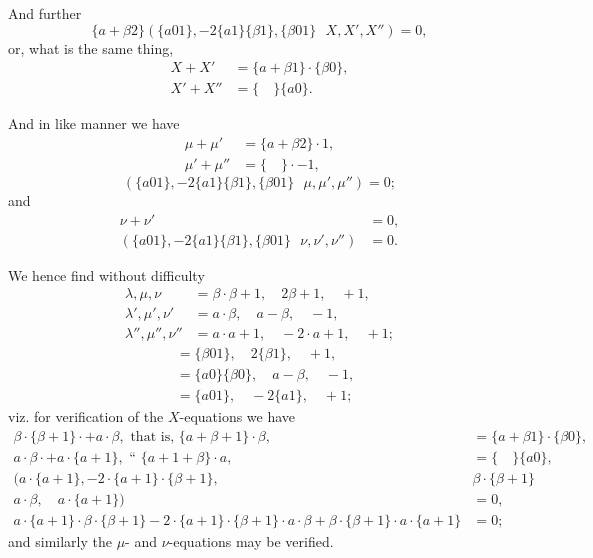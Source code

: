 \documentclass[12pt,a4paper]{article}
\theoremstyle{cayley}
\theoremstyle{definition}
\numberwithin{equation}{section}
\begin{document}
And further
\[
\{a + \beta 2\}(\{a01\}, -2\{a1\}\{\beta1\}, \{\beta01\} \,\,\,\, X, X', X'') = 0,
\]
or, what is the same thing,
\begin{align*}
X + X' &= \{a + \beta 1\} \cdot \{\beta 0\}, \\
X' + X'' &= \{ \quad \} \{a0\}.
\end{align*}

And in like manner we have
\begin{align*}
\mu + \mu' &= \{a + \beta 2\} \cdot 1, \\
\mu' + \mu'' &= \{ \quad \} \cdot -1,
\end{align*}
\[
(\{a01\}, -2\{a1\}\{\beta1\}, \{\beta01\} \,\,\,\, \mu, \mu', \mu'') = 0;
\]
and
\begin{align*}
\nu + \nu' &= 0, \\
(\{a01\}, -2\{a1\}\{\beta1\}, \{\beta01\} \,\,\,\, \nu, \nu', \nu'') &= 0.
\end{align*}

We hence find without difficulty
\begin{align*}
\lambda, \mu, \nu &= \beta \cdot \beta + 1, \quad 2\beta + 1, \quad +1, \\
\lambda', \mu', \nu' &= a \cdot \beta, \quad a - \beta, \quad -1, \\
\lambda'', \mu'', \nu'' &= a \cdot a + 1, \quad -2 \cdot a + 1, \quad +1;
\end{align*}
\begin{align*}
&= \{\beta 01\}, \quad 2\{\beta 1\}, \quad +1, \\
&= \{a0\}\{\beta 0\}, \quad a - \beta, \quad -1, \\
&= \{a01\}, \quad -2\{a1\}, \quad +1;
\end{align*}
viz. for verification of the $X$-equations we have
\begin{align*}
\beta \cdot \{\beta + 1\} \cdot + a \cdot \beta, \text{ that is, } \{a + \beta + 1\} \cdot \beta, &= \{a + \beta 1\} \cdot \{\beta 0\}, \\
a \cdot \beta \cdot + a \cdot \{a + 1\}, \text{ `` } \{a + 1 + \beta\} \cdot a, &= \{ \quad \} \{a0\}, \\
(a \cdot \{a + 1\}, -2 \cdot \{a + 1\} \cdot \{\beta + 1\}, \quad &\beta \cdot \{\beta + 1\} \\
a \cdot \beta, \quad a \cdot \{a + 1\}) &= 0, \\
a \cdot \{a + 1\} \cdot \beta \cdot \{\beta + 1\} - 2 \cdot \{a + 1\} \cdot \{\beta + 1\} \cdot a \cdot \beta + \beta \cdot \{\beta + 1\} \cdot a \cdot \{a + 1\} &= 0;
\end{align*}
and similarly the $\mu$- and $\nu$-equations may be verified.
\end{document}
